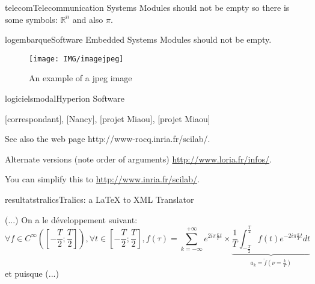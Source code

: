 \documentclass{ra2013}
\begin{document}
\begin{module}{}{telecom}{Telecommunication Systems}
Modules should not be empty so there is  some symbols: $\mathbb{R}^n$ and also $\pi$.
\end{module}

\begin{module}{}{logembarque}{Software Embedded Systems}
Modules should not be empty.

\begin{figure}
\begin{center}
\texttt{[image: IMG/imagejpeg]}
\end{center}
\caption{An example of a jpeg image}
\label{fig:jpegimage}
\end{figure}

\end{module}



\begin{module}{logiciels}{modal}{Hyperion Software} 
\begin{participants}
  [correspondant],
  [Nancy],
  [projet Miaou],
  [projet Miaou]
\end{participants}

See also the web page
{http://www-rocq.inria.fr/scilab/}.

Alternate versions (note order of arguments)
\href{http://www.loria.fr/info/}{\url{http://www.loria.fr/infos/}}.

You can simplify this to 
\url{http://www.inria.fr/scilab/}.
\end{module}



\begin{module}{resultats}{tralics}{Tralics: a LaTeX to XML Translator}

(...) On a le développement suivant:
\[ \forall f\in C^\infty\left(\left[-\frac{T}{2};\frac{T}{2}\right]\right),
   \forall t\in \left[-\frac{T}{2};\frac{T}{2}\right],
   f(\tau) = \sum_{k = -\infty}^{+\infty} e^{2i\pi\frac{k}{T}t} \times
   \underbrace{\frac{1}{T}
               \int_{-\frac{T}{2}}^{\frac{T}{2}} f(t) e^{-2i\pi\frac{k}{T}t} dt
              }_{a_k = \tilde{f}\left(\nu = \frac{k}{T}\right)}
\]
et puisque (...)

\end{module}
\end{document}
